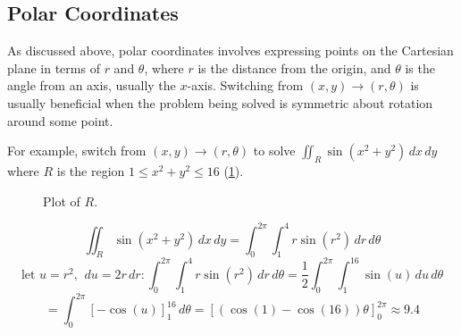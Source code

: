 \documentclass[10pt]{book}
\begin{document}
\subsection{Polar Coordinates}
As discussed above, polar coordinates involves expressing points on the Cartesian plane in terms of $r$ and $\theta$,
where $r$ is the distance from the origin, and $\theta$ is the angle from an axis, usually the $x$-axis. Switching from
$(x,y) \to (r,\theta)$ is usually beneficial when the problem being solved is symmetric about rotation around some point.

For example, switch from $(x,y) \to (r,\theta)$ to solve $\iint_{R} \sin(x^2+y^2)\,dx\,dy$ where $R$ is the region
$1 \le x^2+y^2 \le 16$ (\cref{fig:plot_of_r}).
\begin{figure}[h]
  \centering
  \caption{Plot of $R$.}
  \label{fig:plot_of_r}
\end{figure}
\[
  \iint_{R} \sin(x^2+y^2)\,dx\,dy = \int_{0}^{2\pi} \int_{1}^{4}r \sin(r^2) \,dr\,d\theta
\]
\[
  \text{let }u=r^2,\ \,du = 2r \,dr : \int_{0}^{2\pi} \int_{1}^{4}r \sin(r^2) \,dr\,d\theta = \dfrac{1}{2} \int_{0}^{2\pi} \int_{1}^{16} \sin(u) \,du\,d\theta
\]
\[
  = \int_{0}^{2\pi} \left[-\cos(u) \right]^{16}_{1} \,d\theta = \left[ \left(\cos(1)-\cos(16)\right)\theta\right]^{2\pi}_{0} \approx 9.4
\]
\end{document}
